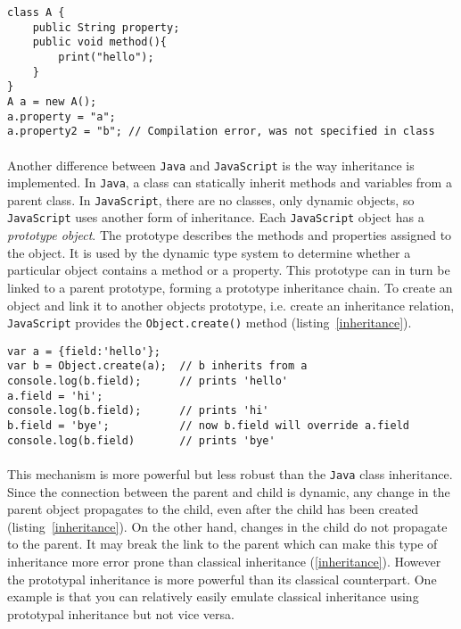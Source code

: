 \begin{lstlisting}[caption=Java,label=statclasses]
class A {
	public String property;
	public void method(){
		print("hello");
	}
}
A a = new A();
a.property = "a";
a.property2 = "b"; // Compilation error, was not specified in class
\end{lstlisting}
\paragraph{}
Another difference between \texttt{Java} and \texttt{JavaScript} is the way inheritance is implemented. In \texttt{Java}, a class can statically inherit methods and variables from a parent class. In \texttt{JavaScript}, there are no classes, only dynamic objects, so \texttt{JavaScript} uses another form of inheritance. Each \texttt{JavaScript} object has a \emph{prototype object}. The prototype describes the methods and properties assigned to the object. It is used by the dynamic type system to determine whether a particular object contains a method or a property. This prototype can in turn be linked to a parent prototype, forming a prototype inheritance chain. To create an object and link it to another objects prototype, i.e. create an inheritance relation, \texttt{JavaScript} provides the \texttt{Object.create()} method (listing~\ref{inheritance}).

\begin{lstlisting}[caption=Inheritance,label=inheritance]
var a = {field:'hello'};
var b = Object.create(a);  // b inherits from a
console.log(b.field);      // prints 'hello'
a.field = 'hi';
console.log(b.field);      // prints 'hi'
b.field = 'bye';           // now b.field will override a.field
console.log(b.field)       // prints 'bye'
\end{lstlisting}	
\paragraph{}
This mechanism is more powerful but less robust than the \texttt{Java} class inheritance. Since the connection between the parent and child is dynamic, any change in the parent object propagates to the child, even after the child has been created (listing~\ref{inheritance}). On the other hand, changes in the child do not propagate to the parent. It may break the link to the parent which can make this type of inheritance more error prone than classical inheritance (\ref{inheritance}). However the prototypal inheritance is more powerful than its classical counterpart. One example is that you can relatively easily emulate classical inheritance using prototypal inheritance but not vice versa\cite{mozilla}.

